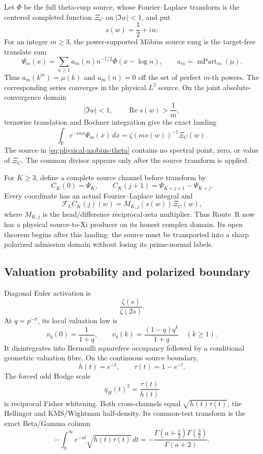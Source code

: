 \documentclass[11pt]{article}
\theoremstyle{definition}
\theoremstyle{remark}
\newcommand{\R}{\mathbb R}
\newcommand{\Rea}{\operatorname{Re}}
\begin{document}
Let \(\Phi\) be the full theta-cusp source, whose Fourier--Laplace
transform is the centered completed function \(\Xi_C\) on
\(|\Im w|<1\), and put
\[
                         s(w)=\frac12+iw.
\tag{3.3}\label{eq:centered-parameter}
\]
For an integer \(m\ge3\), the power-supported M\"obius source rung is the
target-free translate sum
\[
 \Psi_m(x)=\sum_{n\ge1}
   a_m(n)n^{-1/2}\Phi(x-\log n),
 \qquad a_m=\operatorname{mPart}_m(\mu).
\tag{3.4}\label{eq:physical-mobius-theta}
\]
Thus \(a_m(k^m)=\mu(k)\) and \(a_m(n)=0\) off the set of perfect
\(m\)-th powers.
The corresponding series converges in the physical \(L^2\) source.  On
the joint absolute-convergence domain
\[
            |\Im w|<1,\qquad \Rea s(w)>\frac1m,
\]
termwise translation and Bochner integration give the exact landing
\[
 \int_{\R}e^{-iwx}\Psi_m(x)\,dx
   =\zeta\!\left(ms(w)\right)^{-1}\Xi_C(w).
\tag{3.5}\label{eq:physical-xi-landing}
\]
The source in \eqref{eq:physical-mobius-theta} contains no spectral point,
zero, or value of \(\Xi_C\).  The common divisor appears only after the
source transform is applied.

For \(K\ge3\), define a complete source channel before transform by
\[
 C_K(0)=\Psi_K,\qquad
 C_K(j+1)=\Psi_{K+j+1}-\Psi_{K+j}.
\tag{3.6}\label{eq:complete-physical-channel}
\]
Every coordinate has an actual Fourier--Laplace integral and
\[
 \mathcal F_L C_K(j)(w)
   =M_{K,j}(s(w))\Xi_C(w),
\tag{3.7}\label{eq:complete-physical-landing}
\]
where \(M_{K,j}\) is the head/difference reciprocal-zeta multiplier.
Thus Route~R now has a physical source-to-Xi producer on its honest
complex domain.  Its open theorem begins after this landing: the source
must be transported into a sharp polarized admission domain without
losing its prime-normal labels.

\subsection{Valuation probability and polarized boundary}

Diagonal Euler activation is
\[
                          \frac{\zeta(s)}{\zeta(2s)}.
\tag{3.8}\label{eq:activation}
\]
At \(q=p^{-\sigma}\), its local valuation law is
\[
 \nu_q(0)=\frac1{1+q},\qquad
 \nu_q(k)=\frac{(1-q)q^k}{1+q}\quad(k\ge1).
\tag{3.9}\label{eq:valuation-law}
\]
It disintegrates into Bernoulli squarefree occupancy followed by a
conditional geometric valuation fibre.  On the continuous source
boundary,
\[
 h(t)=e^{-t},\qquad \tau(t)=1-e^{-t}.
\tag{3.10}\label{eq:head-tail}
\]
The forced odd Hodge scale
\[
 q_H(t)^2=\frac{\tau(t)}{h(t)}
\tag{3.11}\label{eq:hodge-scale}
\]
is reciprocal Fisher whitening.  Both cross-channels equal
\(\sqrt{h(t)\tau(t)}\), the Hellinger and KMS/Wightman half-density.
Its common-test transform is the exact Beta/Gamma column
\[
 -\int_0^\infty e^{-at}\sqrt{h(t)\tau(t)}\,dt
 =-\frac{\Gamma(a+\tfrac12)\Gamma(\tfrac32)}
          {\Gamma(a+2)}.
\tag{3.12}\label{eq:beta-gamma}
\]
\end{document}
